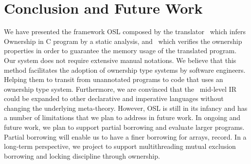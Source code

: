 \section{Conclusion and Future Work}
\label{sec:conclusion}
We have presented the framework OSL composed by the translator \oslt~which infers Ownership in C program by a static analysis, and \oslos~which verifies the ownership properties in order to guarantee the memory usage of the translated program. Our system does not require extensive manual notations. We believe that this method facilitates the adoption of ownership type systems by software engineers. Helping them to transit from unannotated programs to code that uses an ownership type system. Furthermore, we are convinced that the \oslos~mid-level IR could be expanded to other declarative and imperative languages without changing the underlying meta-theory. However, OSL is still in its infancy and has a number of limitations that we plan to address in future work. In ongoing and future work, we plan to support partial borrowing and evaluate larger programs. Partial borrowing will enable us to have a finer borrowing for arrays, record. In a long-term perspective, we project to support multithreading mutual exclusion borrowing and locking discipline through ownership.


